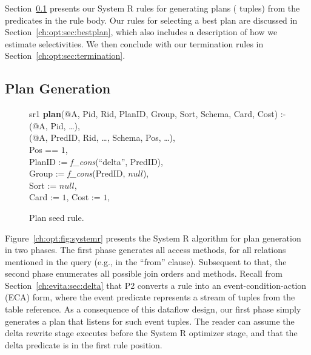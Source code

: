 Section~\ref{ch:opt:sec:plangen} presents our System R rules for generating
plans ( tuples) from the predicates in the rule body.  Our rules for
selecting a best plan are discussed in Section~\ref{ch:opt:sec:bestplan}, which
also includes a description of how we estimate selectivities.  We then conclude
with our termination rules in Section~\ref{ch:opt:sec:termination}.

\subsection{Plan Generation}
\label{ch:opt:sec:plangen}

\begin{figure*}
\ssp
\centering
\begin{boxedminipage}{\linewidth}
sr1 {\bf plan}(@A, Pid, Rid, PlanID, Group, Sort, Schema, Card, Cost) :- \\
(@A, Pid, \ldots),\\
(@A, PredID, Rid, \ldots, Schema, Pos, \ldots),\\
\datalogspace Pos == $1$,\\
\datalogspace PlanID := {\em f\_cons}(``delta'', PredID), \\
\datalogspace Group := {\em f\_cons}(PredID, $null$),\\
\datalogspace Sort := $null$, \\
\datalogspace Card := $1$, Cost := $1$,\\
\end{boxedminipage}
\caption{\label{ch:opt:fig:planseed}Plan seed rule.}
\end{figure*}

Figure~\ref{ch:opt:fig:systemr} presents the System R algorithm for plan
generation in two phases.  The first phase generates all access methods, for all
relations mentioned in the query (e.g., in the ``from'' clause).  Subsequent to
that, the second phase enumerates all possible join orders and methods.  Recall
from Section~\ref{ch:evita:sec:delta} that P2 converts a rule into an
event-condition-action (ECA) form, where the event predicate represents a
stream of tuples from the table reference.  As a consequence of this dataflow
design, our first phase simply generates a plan that listens for such event
tuples.  The reader can assume the delta rewrite stage executes before the
System R optimizer stage, and that the delta predicate is in the first rule
position.  

